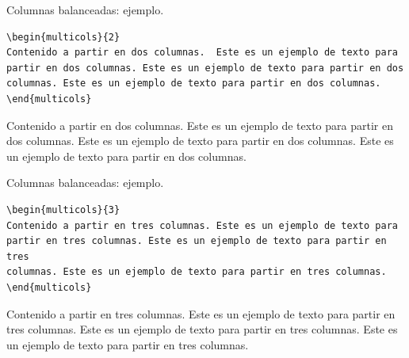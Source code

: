 \documentclass[dvipsnames,xcolor, handout]{beamer}
\theoremstyle{plain}
\theoremstyle{definition}
\begin{document}
\begin{frame}[fragile]{Columnas balanceadas: ejemplo.}
\begin{footnotesize}
\begin{verbatim}
\begin{multicols}{2}
Contenido a partir en dos columnas.  Este es un ejemplo de texto para
partir en dos columnas. Este es un ejemplo de texto para partir en dos
columnas. Este es un ejemplo de texto para partir en dos columnas. 
\end{multicols}
\end{verbatim}
\end{footnotesize}
\vfill\pause
\begin{footnotesize}
    \begin{multicols}{2}
    Contenido a partir en dos columnas.  Este es un ejemplo de texto para
partir en dos columnas. Este es un ejemplo de texto para partir en dos
columnas. Este es un ejemplo de texto para partir en dos columnas. 
    \end{multicols}
\end{footnotesize}

\end{frame}

\begin{frame}[fragile]{Columnas balanceadas: ejemplo.}
\begin{footnotesize}
\begin{verbatim}
\begin{multicols}{3}
Contenido a partir en tres columnas. Este es un ejemplo de texto para
partir en tres columnas. Este es un ejemplo de texto para partir en tres
columnas. Este es un ejemplo de texto para partir en tres columnas. 
\end{multicols}
\end{verbatim}
\end{footnotesize}
\vfill\pause
\begin{footnotesize}
    \begin{multicols}{3}
    Contenido a partir en tres columnas. Este es un ejemplo de
    texto para partir en tres columnas. Este es un ejemplo de
    texto para partir en tres columnas. Este es un ejemplo de
    texto para partir en tres columnas. 
    \end{multicols}
\end{footnotesize}
\end{frame}
\end{document}
